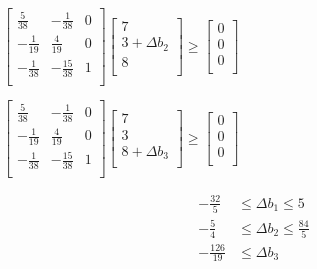\documentclass[../main.tex]{subfiles}
\begin{document}
\begin{questions}
\begin{solution}
$\begin{bmatrix}
  \frac{5}{38} & -\frac{1}{38} & 0 \\[3mm]
  -\frac{1}{19} & \frac{4}{19} & 0 \\[3mm]
  -\frac{1}{38} & -\frac{15}{38} & 1 \\
\end{bmatrix}
\begin{bmatrix}
  7 \\[3mm] 3 + \Delta b_2 \\[3mm] 8\\
\end{bmatrix}
\geq
\begin{bmatrix}
  0 \\[3mm] 0 \\[3mm] 0\\
\end{bmatrix}
$

$\begin{bmatrix}
  \frac{5}{38} & -\frac{1}{38} & 0 \\[3mm]
  -\frac{1}{19} & \frac{4}{19} & 0 \\[3mm]
  -\frac{1}{38} & -\frac{15}{38} & 1 \\
\end{bmatrix}
\begin{bmatrix}
  7 \\[3mm] 3 \\[3mm] 8 + \Delta b_3 \\
\end{bmatrix}
\geq
\begin{bmatrix}
  0 \\[3mm] 0 \\[3mm] 0\\
\end{bmatrix}
$



\end{solution}


\begin{solution}

    \begin{align*}
    -\frac{32}{5} & \leq \Delta b_1 \leq  5 \\[4mm]
    -\frac{5}{4}  &\leq \Delta b_2 \leq  \frac{84}{5} \\[4mm]
     -\frac{126}{19} & \leq \Delta b_3 \\
  \end{align*}
    
\end{solution}
    

\end{questions}
\end{document}
